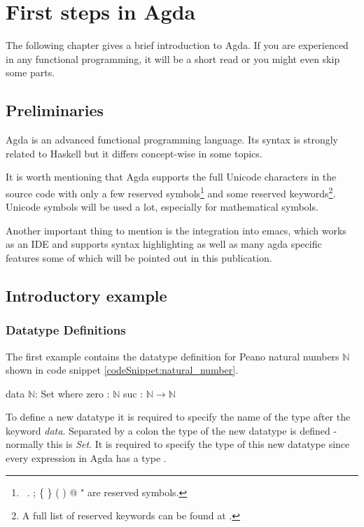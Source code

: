 \section{First steps in Agda}\label{section:first_steps_in_agda}
The following chapter gives a brief introduction to Agda. If you are experienced in any functional programming, it will be a short read or you might even skip some parts.

\subsection{Preliminaries}
Agda is an advanced functional programming language. Its syntax is strongly related to Haskell but it differs concept-wise in some topics. 

It is worth mentioning that Agda supports the full Unicode characters in the source code with only a few reserved symbols\footnote{\, . ; \{ \} ( ) @ " are reserved symbols\cite{AgdaReadTheDocsStructure}.} 
and some reserved keywords\footnote{A full list of reserved keywords can be found at \cite{AgdaReadTheDocsStructure}.}. 
Unicode symbols will be used a lot, especially for mathematical symbols.

Another important thing to mention is the integration into emacs, which works as an IDE and supports syntax highlighting as well as many agda specific features some of which will be pointed out in this publication.

\subsection{Introductory example}\label{section:agda_introduction_example}
\subsubsection{Datatype Definitions}
The first example contains the datatype definition for Peano natural numbers $\mathbb{N}$ shown in code snippet \ref{codeSnippet:natural_number}.

\begin{codesnippet}[mathescape=true, caption={Definition of the peano natural numbers datatype in Agda}, label={codeSnippet:natural_number}]
data $\mathbb{N}$: Set where
  zero : $\mathbb{N}$
  suc  : $\mathbb{N} \rightarrow \mathbb{N}$
\end{codesnippet}

To define a new datatype it is required to specify the name of the type after the keyword \emph{data}.
Separated by a colon the type of the new datatype is defined - normally this is \emph{Set}.
It is required to specify the type of this new datatype since  every expression in Agda has a type \cite{10.1145/2841316}.


